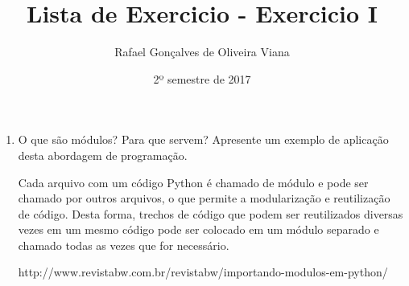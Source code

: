 \documentclass[12pt]{article}
\title{Lista de Exercicio  - Exercicio I }
\author{Rafael Gonçalves de  Oliveira Viana}
\date{2º semestre de 2017}
\begin{document}
\maketitle

\begin{enumerate}
\item
O que são módulos? Para que servem? Apresente um exemplo de aplicação desta
abordagem de programação.

Cada arquivo com um código Python é chamado de módulo e pode ser chamado por outros arquivos, o que permite a modularização e
reutilização de código. Desta forma, trechos de código que podem ser reutilizados diversas vezes em um mesmo código pode ser colocado em
um módulo separado e chamado todas as vezes que for necessário.


http://www.revistabw.com.br/revistabw/importando-modulos-em-python/
\end{enumerate}
\end{document}
